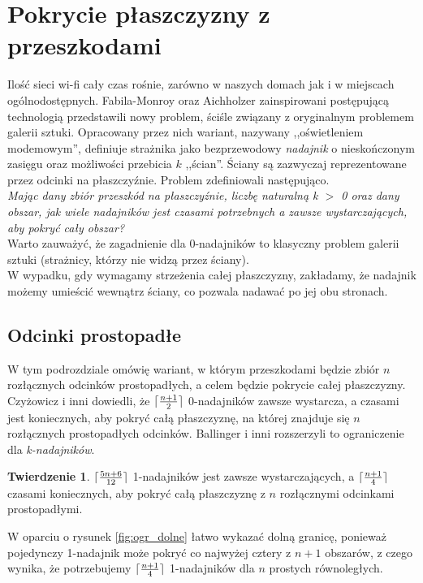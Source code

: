 \documentclass[brudnopis]{xmgr}
\DeclarePairedDelimiter\ceil{\lceil}{\rceil}
\theoremstyle{definition}
\newtheorem{Twierdzenie}{Twierdzenie}
\begin{document}
\section{Pokrycie płaszczyzny z przeszkodami}
	Ilość sieci wi-fi cały czas rośnie, zarówno w naszych domach jak i w miejscach ogólnodostępnych. Fabila-Monroy oraz Aichholzer \cite{fabilamonroy} zainspirowani postępującą technologią przedstawili nowy problem, ściśle związany z oryginalnym problemem galerii sztuki. Opracowany przez nich wariant, nazywany ,,oświetleniem modemowym'', definiuje strażnika jako bezprzewodowy \emph{nadajnik} o nieskończonym zasięgu oraz możliwości przebicia $k$ ,,ścian''. Ściany są zazwyczaj reprezentowane przez odcinki na płaszczyźnie. Problem zdefiniowali następująco.
\\\indent \emph{Mając dany zbiór przeszkód na płaszczyźnie, liczbę naturalną k $>$ 0 oraz dany obszar, jak wiele nadajników jest czasami potrzebnych a zawsze wystarczających, aby pokryć cały obszar?}  
\\\indent Warto zauważyć, że zagadnienie dla 0-nadajników to klasyczny problem galerii sztuki (strażnicy, którzy nie widzą przez ściany).
\\\indent W wypadku, gdy wymagamy strzeżenia całej płaszczyzny, zakładamy, że nadajnik możemy umieścić wewnątrz ściany, co pozwala nadawać po jej obu stronach.
\subsection{Odcinki prostopadłe}
W tym podrozdziale omówię wariant, w którym przeszkodami będzie zbiór $n$ rozłącznych odcinków prostopadłych, a celem będzie pokrycie całej płaszczyzny. Czyżowicz i inni \cite{czyzowicz} dowiedli, że $\ceil{\frac{n+1}{2}}$ 0-nadajników zawsze wystarcza, a czasami jest koniecznych, aby pokryć całą płaszczyznę, na której znajduje się $n$ rozłącznych prostopadłych odcinków. Ballinger i inni \cite{knadajniki} rozszerzyli to ograniczenie dla \emph{k-nadajników}.

\begin{Twierdzenie} \label{ograniczenie zbiór odcinków prostopadłych} \cite{knadajniki}
  $\ceil{\frac{5n+6}{12}}$ 1-nadajników jest zawsze wystarczających, a $\ceil{\frac{n+1}{4}}$ czasami koniecznych, aby pokryć całą płaszczyznę z $n$ rozłącznymi odcinkami prostopadłymi.
\end{Twierdzenie}
\indent W oparciu o rysunek \ref{fig:ogr_dolne} łatwo wykazać dolną granicę, ponieważ pojedynczy 1-nadajnik może pokryć co najwyżej cztery z $n + 1$ obszarów, z czego wynika, że potrzebujemy $\ceil{\frac{n+1}{4}}$ 1-nadajników dla $n$ prostych równoległych.
\end{document}
